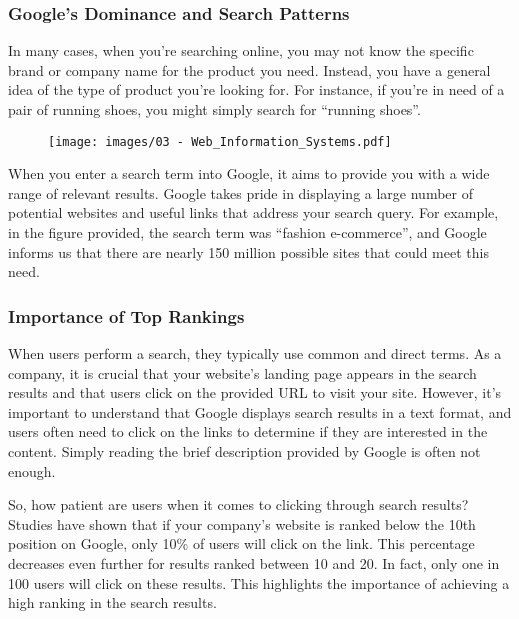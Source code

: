 \subsubsection{Google's Dominance and Search
  Patterns}\label{googles-dominance-and-search-patterns}

In many cases, when you're searching online, you may not know the
specific brand or company name for the product you need. Instead, you
have a general idea of the type of product you're looking for. For
instance, if you're in need of a pair of running shoes, you might simply
search for ``running shoes''.

\begin{figure}[!h]
  \centering
  \texttt{[image: images/03 - Web\_Information\_Systems.pdf]}
\end{figure}

When you enter a search term into Google, it aims to provide you with a
wide range of relevant results. Google takes pride in displaying a large
number of potential websites and useful links that address your search
query. For example, in the figure provided, the search term was
``fashion e-commerce'', and Google informs us that there are nearly 150
million possible sites that could meet this need.

\subsubsection{Importance of Top
  Rankings}\label{importance-of-top-rankings}

When users perform a search, they typically use common and direct terms.
As a company, it is crucial that your website's landing page appears in
the search results and that users click on the provided URL to visit
your site. However, it's important to understand that Google displays
search results in a text format, and users often need to click on the
links to determine if they are interested in the content. Simply reading
the brief description provided by Google is often not enough.

So, how patient are users when it comes to clicking through search
results? Studies have shown that if your company's website is ranked
below the 10th position on Google, only 10\% of users will click on the
link. This percentage decreases even further for results ranked between
10 and 20. In fact, only one in 100 users will click on these results.
This highlights the importance of achieving a high ranking in the search
results.


